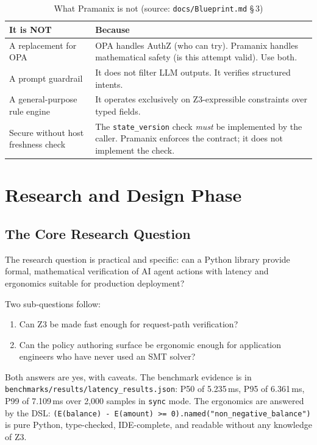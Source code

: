 \documentclass[12pt,a4paper,oneside]{report}
\newcommand{\fname}[1]{\texttt{#1}}          %
\newcommand{\code}[1]{\texttt{#1}}           %
\newcommand{\cfrsec}[1]{\S\,#1}             %
\begin{document}
\begin{table}[h]
\centering\small
\begin{tabular}{@{}p{4.4cm} p{9.2cm}@{}}
\toprule
\textbf{It is NOT} & \textbf{Because} \\
\midrule
A replacement for OPA &
  OPA handles AuthZ (who can try). Pramanix handles mathematical safety (is
  this attempt valid). Use both. \\[4pt]
A prompt guardrail &
  It does not filter LLM outputs. It verifies structured intents. \\[4pt]
A general-purpose rule engine &
  It operates exclusively on Z3-expressible constraints over typed fields. \\[4pt]
Secure without host freshness check &
  The \code{state\_version} check \emph{must} be implemented by the caller.
  Pramanix enforces the contract; it does not implement the check. \\
\bottomrule
\end{tabular}
\caption{What Pramanix is not (source: \fname{docs/Blueprint.md} \cfrsec{3})}
\end{table}

\chapter{Research and Design Phase}

\section{The Core Research Question}

The research question is practical and specific: can a Python library provide
formal, mathematical verification of AI agent actions with latency and
ergonomics suitable for production deployment?

Two sub-questions follow:
\begin{enumerate}
  \item Can Z3 be made fast enough for request-path verification?
  \item Can the policy authoring surface be ergonomic enough for application
        engineers who have never used an SMT solver?
\end{enumerate}

Both answers are yes, with caveats. The benchmark evidence is in
\fname{benchmarks/results/latency\_results.json}: P50 of 5.235\,ms, P95 of
6.361\,ms, P99 of 7.109\,ms over 2,000 samples in \code{sync} mode. The
ergonomics are answered by the DSL:
\code{(E(balance) - E(amount) >= 0).named("non\_negative\_balance")} is pure
Python, type-checked, IDE-complete, and readable without any knowledge of Z3.
\end{document}
